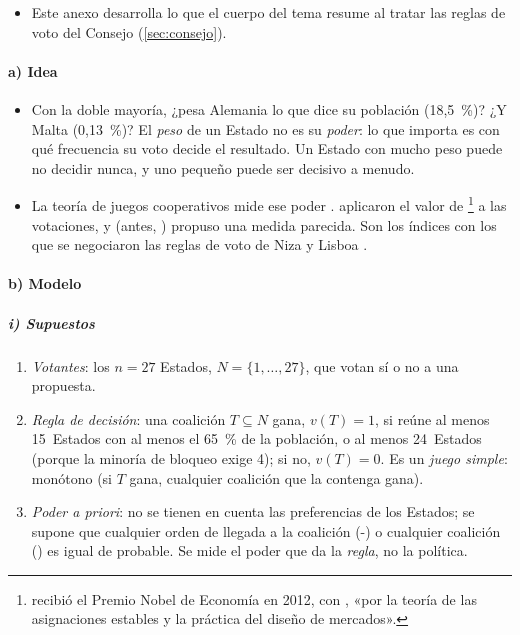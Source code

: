 \documentclass[11pt]{article}
\begin{document}
\begin{itemize}
\item Este anexo desarrolla lo que el cuerpo del tema resume al tratar las reglas de voto del Consejo (\ref{sec:consejo}).
\end{itemize}

\paragraph{a) Idea}

\begin{itemize}
\item Con la doble mayoría, ¿pesa Alemania lo que dice su población (18,5~\%)? ¿Y Malta (0,13~\%)? El \emph{peso} de un Estado no es su \emph{poder}: lo que importa es con qué frecuencia su voto decide el resultado. Un Estado con mucho peso puede no decidir nunca, y uno pequeño puede ser decisivo a menudo.
\item La teoría de juegos cooperativos mide ese poder . \textcite{ShapleyShubik1954Method} aplicaron el valor de \footnote{ recibió el Premio Nobel de Economía en 2012, con , «por la teoría de las asignaciones estables y la práctica del diseño de mercados»\nocite{Nobel2012RothShapley}.} a las votaciones, y \textcite{Banzhaf1965Weighted} (antes, \textcite{Penrose1946Elementary}) propuso una medida parecida. Son los índices con los que se negociaron las reglas de voto de Niza y Lisboa  .
\end{itemize}

\paragraph{b) Modelo}

\subparagraph{i) Supuestos}

\begin{enumerate}
\item \emph{Votantes}: los $n=27$ Estados, $N=\{1,\ldots,27\}$, que votan sí o no a una propuesta.
\item \emph{Regla de decisión}: una coalición $T\subseteq N$ gana, $v(T)=1$, si reúne al menos 15~Estados con al menos el 65~\% de la población, o al menos 24~Estados (porque la minoría de bloqueo exige 4); si no, $v(T)=0$. Es un \emph{juego simple}: monótono (si $T$ gana, cualquier coalición que la contenga gana).
\item \emph{Poder a priori}: no se tienen en cuenta las preferencias de los Estados; se supone que cualquier orden de llegada a la coalición (-) o cualquier coalición () es igual de probable. Se mide el poder que da la \emph{regla}, no la política.
\end{enumerate}
\end{document}
